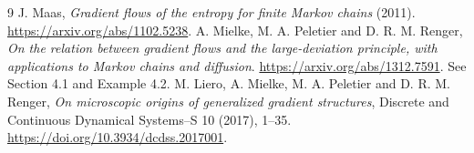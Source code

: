 \documentclass[11pt,a4paper]{article}
\begin{document}
\begin{thebibliography}{9}
 J. Maas, \emph{Gradient flows of the entropy for finite Markov
chains} (2011). \url{https://arxiv.org/abs/1102.5238}.
 A. Mielke, M. A. Peletier and D. R. M. Renger,
\emph{On the relation between gradient flows and the large-deviation principle,
with applications to Markov chains and diffusion}.
\url{https://arxiv.org/abs/1312.7591}. See Section 4.1 and Example 4.2.
 M. Liero, A. Mielke, M. A. Peletier and D. R. M. Renger,
\emph{On microscopic origins of generalized gradient structures},
Discrete and Continuous Dynamical Systems--S 10 (2017), 1--35.
\url{https://doi.org/10.3934/dcdss.2017001}.
\end{thebibliography}
\end{document}
